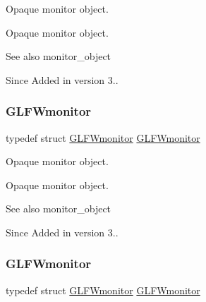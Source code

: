 Opaque monitor object. 

Opaque monitor object.

\begin{DoxySeeAlso}{See also}
monitor\+\_\+object
\end{DoxySeeAlso}
\begin{DoxySince}{Since}
Added in version 3.. 
\end{DoxySince}
\mbox{\label{group__monitor_ga8d9efd1cde9426692c73fe40437d0ae3}} 
\subsubsection{\texorpdfstring{G\+L\+F\+Wmonitor}{GLFWmonitor}\hspace{0.1cm}{\footnotesize\ttfamily [2/5]}}
{\footnotesize\ttfamily typedef struct \hyperlink{group__monitor_ga8d9efd1cde9426692c73fe40437d0ae3}{G\+L\+F\+Wmonitor} \hyperlink{group__monitor_ga8d9efd1cde9426692c73fe40437d0ae3}{G\+L\+F\+Wmonitor}}



Opaque monitor object. 

Opaque monitor object.

\begin{DoxySeeAlso}{See also}
monitor\+\_\+object
\end{DoxySeeAlso}
\begin{DoxySince}{Since}
Added in version 3.. 
\end{DoxySince}
\mbox{\label{group__monitor_ga8d9efd1cde9426692c73fe40437d0ae3}} 
\subsubsection{\texorpdfstring{G\+L\+F\+Wmonitor}{GLFWmonitor}\hspace{0.1cm}{\footnotesize\ttfamily [3/5]}}
{\footnotesize\ttfamily typedef struct \hyperlink{group__monitor_ga8d9efd1cde9426692c73fe40437d0ae3}{G\+L\+F\+Wmonitor} \hyperlink{group__monitor_ga8d9efd1cde9426692c73fe40437d0ae3}{G\+L\+F\+Wmonitor}}



